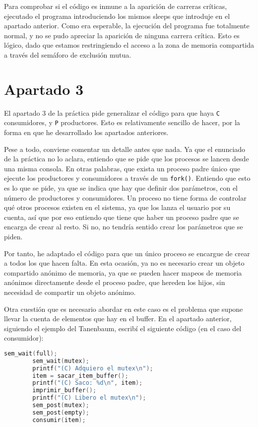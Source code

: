 \documentclass[a4paper]{article}
\begin{document}
Para comprobar si el código es inmune a la aparición de carreras críticas, ejecutado el programa introduciendo los mismos sleeps que introduje en el apartado anterior. Como era esperable, la ejecución del programa fue totalmente normal, y no se pudo apreciar la aparición de ninguna carrera crítica. Esto es lógico, dado que estamos restringiendo el acceso a la zona de memoria compartida a través del semáforo de exclusión mutua.

\section{Apartado 3}

El apartado 3 de la práctica pide generalizar el código para que haya \texttt{C} consumidores, y \texttt{P} productores. Esto es relativamente sencillo de hacer, por la forma en que he desarrollado los apartados anteriores.

Pese a todo, conviene comentar un detalle antes que nada. Ya que el enunciado de la práctica no lo aclara, entiendo que se pide que los procesos se lancen desde una misma consola. En otras palabras, que exista un proceso padre único que ejecute los productores y consumidores a través de un \texttt{fork()}. Entiendo que esto es lo que se pide, ya que se indica que hay que definir dos parámetros, con el número de productores y consumidores. Un proceso no tiene forma de controlar qué otros procesos existen en el sistema, ya que los lanza el usuario por su cuenta, así que por eso entiendo que tiene que haber un proceso padre que se encarga de crear al resto. Si no, no tendría sentido crear los parámetros que se piden.

Por tanto, he adaptado el código para que un único proceso se encargue de crear a todos los que hacen falta. En esta ocasión, ya no es necesario crear un objeto compartido anónimo de memoria, ya que se pueden hacer mapeos de memoria anónimos directamente desde el proceso padre, que hereden los hijos, sin necesidad de compartir un objeto anónimo.

Otra cuestión que es necesario abordar en este caso es el problema que supone llevar la cuenta de elementos que hay en el buffer. En el apartado anterior, siguiendo el ejemplo del Tanenbaum, escribí el siguiente código (en el caso del consumidor):

\begin{lstlisting}[language=C]
        sem_wait(full);
        sem_wait(mutex);
        printf("(C) Adquiero el mutex\n");
        item = sacar_item_buffer();
        printf("(C) Saco: %d\n", item);
        imprimir_buffer();
        printf("(C) Libero el mutex\n");
        sem_post(mutex);
        sem_post(empty);
        consumir(item);
\end{lstlisting}
\end{document}

